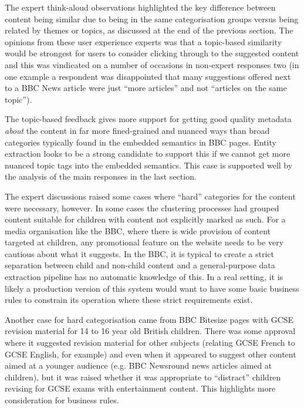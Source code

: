 The expert think-aloud observations highlighted the key difference
between content being similar due to being in the same categorisation
groups versus being related by themes or topics, as discussed at the
end of the previous section. The opinions from these user experience
experts was that a topic-based similarity would be strongest for users
to consider clicking through to the suggested content and this was
vindicated on a number of occasions in non-expert responses two
(in one example a respondent was disappointed that many suggestions
offered next to a BBC News article were just ``more articles'' and
not ``articles on the same topic'').

The topic-based feedback gives more support for getting good quality
metadata \emph{about} the content in far more fined-grained and
nuanced ways than broad categories typically found in the embedded
semantics in BBC pages. Entity extraction looks to be a strong
candidate to support this if we cannot get more nuanced topic tags
into the embedded semantics. This case is supported well by the
analysis of the main responses in the last section.

The expert discussions raised some cases where ``hard'' categories
for the content were necessary, however. In some cases the clustering
processes had grouped content suitable for children with content not
explicitly marked as such. For a media organisation like the BBC, where
there is wide provision of content targeted at children, any
promotional feature on the website needs to be very cautious about
what it suggests. In the BBC, it is typical to create a strict
separation between child and non-child content and a general-purpose
data extraction pipeline has no automatic knowledge of this. In a
real setting, it is likely a production version of this system would
want to have some basic business rules to constrain its operation
where these strict requirements exist.

Another case for hard categorisation came from BBC Bitesize pages
with GCSE revision material for 14 to 16 year old British children.
There was some approval where it suggested revision material
for other subjects (relating GCSE French to GCSE English, for
example) and even when it appeared to suggest other content aimed
at a younger audience (e.g. BBC Newsround news articles aimed at children),
but it was raised whether it was appropriate to ``distract'' children
revising for GCSE exams with entertainment content. This highlights
more consideration for business rules.

